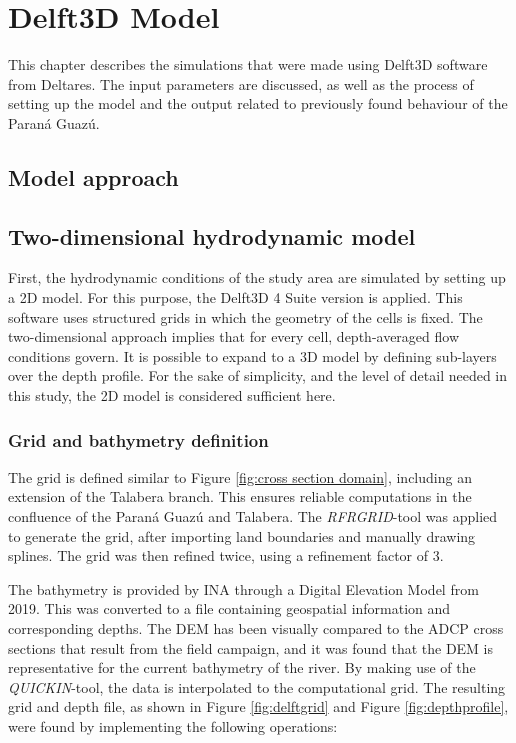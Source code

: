 \chapter{Delft3D Model}
\label{chap:Delft3DModel}
This chapter describes the simulations that were made using Delft3D software from Deltares. The input parameters are discussed, as well as the process of setting up the model and the output related to previously found behaviour of the Paraná Guazú. 

\section{Model approach}


\section{Two-dimensional hydrodynamic model}
First, the hydrodynamic conditions of the study area are simulated by setting up a 2D model. For this purpose, the Delft3D 4 Suite version is applied. This software uses structured grids in which the geometry of the cells is fixed. The two-dimensional approach implies that for every cell, depth-averaged flow conditions govern. It is possible to expand to a 3D model by defining sub-layers over the depth profile. For the sake of simplicity, and the level of detail needed in this study, the 2D model is considered sufficient here. 

\subsection{Grid and bathymetry definition}
\label{section:bathemetry}
The grid is defined similar to Figure \ref{fig:cross section domain}, including an extension of the Talabera branch. This ensures reliable computations in the confluence of the Paraná Guazú and Talabera. The \textit{RFRGRID}-tool was applied to generate the grid, after importing land boundaries and manually drawing splines. The grid was then refined twice, using a refinement factor of 3. 

The bathymetry is provided by INA through a Digital Elevation Model from 2019. This was converted to a file containing geospatial information and corresponding depths. The DEM has been visually compared to the ADCP cross sections that result from the field campaign, and it was found that the DEM is representative for the current bathymetry of the river. By making use of the \textit{QUICKIN}-tool, the data is interpolated to the computational grid. The resulting grid and depth file, as shown in Figure \ref{fig:delftgrid} and Figure \ref{fig:depthprofile}, were found by implementing the following operations:

